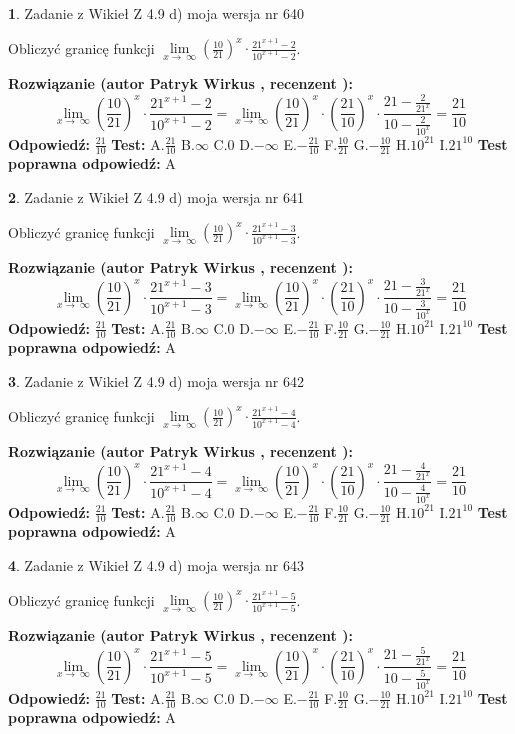 \documentclass[12pt, a4paper]{article}
\theoremstyle{definition} %
\newtheorem{zad}{}
\newcommand{\zadStart}[1]{\begin{zad}#1\newline}
\newcommand{\zadStop}{\end{zad}}
\newcommand{\rozwStart}[2]{\noindent \textbf{Rozwiązanie (autor #1 , recenzent #2): }\newline}
\newcommand{\rozwStop}{\newline}
\newcommand{\odpStart}{\noindent \textbf{Odpowiedź:}\newline}
\newcommand{\odpStop}{\newline}
\newcommand{\testStart}{\noindent \textbf{Test:}\newline}
\newcommand{\testStop}{\newline}
\newcommand{\kluczStart}{\noindent \textbf{Test poprawna odpowiedź:}\newline}
\newcommand{\kluczStop}{\newline}
\begin{document}
\zadStart{Zadanie z Wikieł Z 4.9 d) moja wersja nr 640}


Obliczyć granicę funkcji  $\lim\limits_{x\to\ \infty}(\frac{10}{21})^{x}\cdot\frac{21^{x+1}-2}{10^{x+1}-2}$.
\zadStop
\rozwStart{Patryk Wirkus}{}
$$\lim\limits_{x\to\ \infty}(\frac{10}{21})^{x}\cdot\frac{21^{x+1}-2}{10^{x+1}-2}=\lim\limits_{x\to\ \infty}(\frac{10}{21})^{x}\cdot(\frac{21}{10})^{x} \cdot \frac{21-\frac{2}{21^{x}}}{10-\frac{2}{10^{x}}} = \frac{21}{10}$$
\rozwStop
\odpStart
$\frac{21}{10}$
\odpStop
\testStart
A.$\frac{21}{10}$ B.$\infty$ C.$0$ D.$-\infty$ E.$-\frac{21}{10}$
F.$\frac{10}{21}$ G.$-\frac{10}{21}$
H.$10^{21}$
I.$21^{10}$
\testStop
\kluczStart
A
\kluczStop



\zadStart{Zadanie z Wikieł Z 4.9 d) moja wersja nr 641}


Obliczyć granicę funkcji  $\lim\limits_{x\to\ \infty}(\frac{10}{21})^{x}\cdot\frac{21^{x+1}-3}{10^{x+1}-3}$.
\zadStop
\rozwStart{Patryk Wirkus}{}
$$\lim\limits_{x\to\ \infty}(\frac{10}{21})^{x}\cdot\frac{21^{x+1}-3}{10^{x+1}-3}=\lim\limits_{x\to\ \infty}(\frac{10}{21})^{x}\cdot(\frac{21}{10})^{x} \cdot \frac{21-\frac{3}{21^{x}}}{10-\frac{3}{10^{x}}} = \frac{21}{10}$$
\rozwStop
\odpStart
$\frac{21}{10}$
\odpStop
\testStart
A.$\frac{21}{10}$ B.$\infty$ C.$0$ D.$-\infty$ E.$-\frac{21}{10}$
F.$\frac{10}{21}$ G.$-\frac{10}{21}$
H.$10^{21}$
I.$21^{10}$
\testStop
\kluczStart
A
\kluczStop



\zadStart{Zadanie z Wikieł Z 4.9 d) moja wersja nr 642}


Obliczyć granicę funkcji  $\lim\limits_{x\to\ \infty}(\frac{10}{21})^{x}\cdot\frac{21^{x+1}-4}{10^{x+1}-4}$.
\zadStop
\rozwStart{Patryk Wirkus}{}
$$\lim\limits_{x\to\ \infty}(\frac{10}{21})^{x}\cdot\frac{21^{x+1}-4}{10^{x+1}-4}=\lim\limits_{x\to\ \infty}(\frac{10}{21})^{x}\cdot(\frac{21}{10})^{x} \cdot \frac{21-\frac{4}{21^{x}}}{10-\frac{4}{10^{x}}} = \frac{21}{10}$$
\rozwStop
\odpStart
$\frac{21}{10}$
\odpStop
\testStart
A.$\frac{21}{10}$ B.$\infty$ C.$0$ D.$-\infty$ E.$-\frac{21}{10}$
F.$\frac{10}{21}$ G.$-\frac{10}{21}$
H.$10^{21}$
I.$21^{10}$
\testStop
\kluczStart
A
\kluczStop



\zadStart{Zadanie z Wikieł Z 4.9 d) moja wersja nr 643}


Obliczyć granicę funkcji  $\lim\limits_{x\to\ \infty}(\frac{10}{21})^{x}\cdot\frac{21^{x+1}-5}{10^{x+1}-5}$.
\zadStop
\rozwStart{Patryk Wirkus}{}
$$\lim\limits_{x\to\ \infty}(\frac{10}{21})^{x}\cdot\frac{21^{x+1}-5}{10^{x+1}-5}=\lim\limits_{x\to\ \infty}(\frac{10}{21})^{x}\cdot(\frac{21}{10})^{x} \cdot \frac{21-\frac{5}{21^{x}}}{10-\frac{5}{10^{x}}} = \frac{21}{10}$$
\rozwStop
\odpStart
$\frac{21}{10}$
\odpStop
\testStart
A.$\frac{21}{10}$ B.$\infty$ C.$0$ D.$-\infty$ E.$-\frac{21}{10}$
F.$\frac{10}{21}$ G.$-\frac{10}{21}$
H.$10^{21}$
I.$21^{10}$
\testStop
\kluczStart
A
\kluczStop
\end{document}
